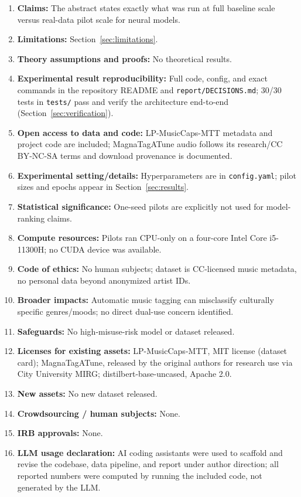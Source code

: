 \documentclass{article}
\begin{document}
\begin{enumerate}
  \item \textbf{Claims:} \answerYes{} The abstract states exactly what was
    run at full baseline scale versus real-data pilot scale for neural models.
  \item \textbf{Limitations:} \answerYes{} Section~\ref{sec:limitations}.
  \item \textbf{Theory assumptions and proofs:} \answerNA{} No theoretical results.
  \item \textbf{Experimental result reproducibility:} \answerYes{} Full
    code, config, and exact commands in the repository README and
    \texttt{report/DECISIONS.md}; 30/30 tests in \texttt{tests/} pass and
    verify the architecture end-to-end (Section~\ref{sec:verification}).
  \item \textbf{Open access to data and code:} \answerYes{} LP-MusicCaps-MTT
    metadata and project code are included; MagnaTagATune audio follows its
    research/CC BY-NC-SA terms and download provenance is documented.
  \item \textbf{Experimental setting/details:} \answerYes{} Hyperparameters
    are in \texttt{config.yaml}; pilot sizes and epochs appear in Section~\ref{sec:results}.
  \item \textbf{Statistical significance:} \answerNA{} One-seed pilots are
    explicitly not used for model-ranking claims.
  \item \textbf{Compute resources:} \answerYes{} Pilots ran CPU-only on a
    four-core Intel Core i5-11300H; no CUDA device was available.
  \item \textbf{Code of ethics:} \answerYes{} No human subjects; dataset is
    CC-licensed music metadata, no personal data beyond anonymized artist IDs.
  \item \textbf{Broader impacts:} \answerYes{} Automatic music tagging can
    misclassify culturally specific genres/moods; no direct dual-use concern identified.
  \item \textbf{Safeguards:} \answerNA{} No high-misuse-risk model or dataset released.
  \item \textbf{Licenses for existing assets:} \answerYes{} LP-MusicCaps-MTT, MIT license (dataset card); MagnaTagATune, released by the original authors for research use via City University MIRG; distilbert-base-uncased, Apache 2.0.
  \item \textbf{New assets:} \answerNA{} No new dataset released.
  \item \textbf{Crowdsourcing / human subjects:} \answerNA{} None.
  \item \textbf{IRB approvals:} \answerNA{} None.
  \item \textbf{LLM usage declaration:} \answerYes{} AI coding assistants were used
    to scaffold and revise the codebase, data pipeline, and report under
    author direction; all reported numbers were computed by running the
    included code, not generated by the LLM.
\end{enumerate}
\end{document}
